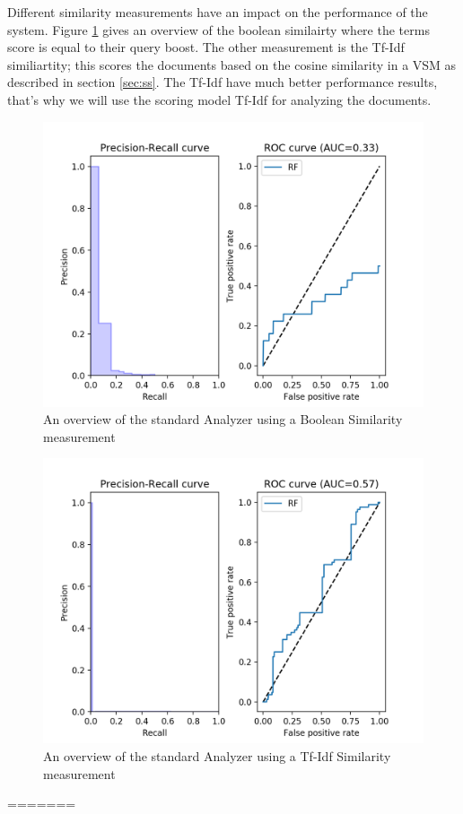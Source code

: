 \documentclass[11pt]{article}
\begin{document}
Different similarity measurements have an impact on the performance of the system. Figure \ref{fig:bool} gives an overview of the boolean similairty where the terms score is equal to their query boost. The other measurement is the Tf-Idf similiartity; this scores the documents based on the cosine similarity in a VSM as described in section \ref{sec:ss}. The Tf-Idf have much better performance results, that's why we will use the scoring model Tf-Idf for analyzing the documents.

\begin{figure}[htp]
	\centering
	\includegraphics[width=\textwidth]{images/Boolean-Standard}
	\caption{An overview of the standard Analyzer using a Boolean Similarity measurement}
	\label{fig:bool}
\end{figure}
\begin{figure}[htp]
	\centering
	\includegraphics[width=\textwidth]{images/Tfidf-standard}
	\caption{An overview of the standard Analyzer using a Tf-Idf Similarity measurement}
	\label{fig:tfidf}
\end{figure}
=======
\end{document}
